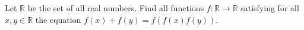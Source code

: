 Let $\mathbb{R}$ be the set of all real numbers. Find all functions $f:\mathbb{R}\rightarrow\mathbb{R}$ satisfying for all $x,y\in\mathbb{R}$ the equation $f(x)+f(y)=f(f(x)f(y))$.